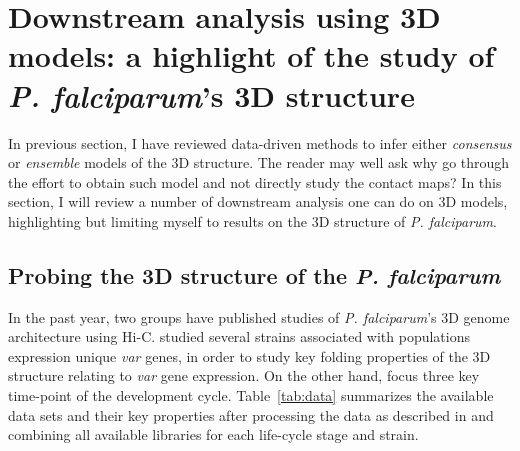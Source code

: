 \documentclass[letterpaper,12pt]{article}
\begin{document}
\section*{Downstream analysis using 3D models: a highlight of the study of
{\em P. falciparum}'s 3D structure}

In previous section, I have reviewed data-driven methods to infer either
\textit{consensus} or \textit{ensemble} models of the 3D structure. The reader
may well ask why go through the effort to obtain such model and not directly
study the contact maps?  In this section, I will review a number of downstream
analysis one can do on 3D models, highlighting but limiting myself to results
on the 3D structure of {\em P. falciparum}.

\subsection{Probing the 3D structure of the {\em P. falciparum}}
In the past year, two groups have published studies of {\em P.
falciparum}'s 3D genome architecture using Hi-C. \citet{lemieux:genome-wide}
studied several strains associated with populations expression unique
\textit{var} genes, in order to study key folding properties of the 3D
structure relating to \textit{var} gene expression. On the other hand,
\citet{ay:three-dimensional} focus three key time-point of the development
cycle. Table~\ref{tab:data} summarizes the available data sets and their key
properties after processing the data as described in
\citet{ay:three-dimensional} and combining all available libraries for each
life-cycle stage and strain.
\end{document}
